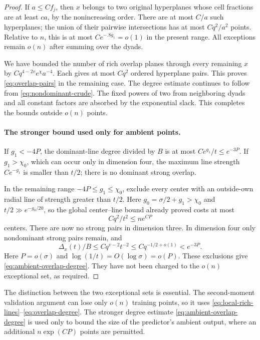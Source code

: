 \begin{proof}
If $a\le Cf_j$, then $x$ belongs to two original hyperplanes whose cell
fractions are at least $ca$, by the nonincreasing order.  There are at
most $C/a$ such hyperplanes; the union of their pairwise intersections
has at most $Cq^2/a^2$ points.  Relative to $n$, this is at most
$Ce^{-.8g_1}=o(1)$ in the present range.  All exceptions remain $o(n)$
after summing over the dyads.

We have bounded the number of rich overlap planes through every
remaining $x$ by $Cq^{4-2v}e^\chi a^{-4}$.  Each gives at most $Cq^2$
ordered hyperplane pairs.  This proves
\eqref{eq:overlap-pairs} in the remaining case.  The degree estimate
continues to follow from \eqref{eq:nondominant-crude}.  The fixed powers
of two from neighboring dyads and all constant factors are absorbed by
the exponential slack.  This completes the bounds outside $o(n)$ points.

\paragraph{The stronger bound used only for ambient points.}
If $g_1<-4P$, the dominant-line degree divided by $B$ is at most
$Ce^{g_1}/t\le e^{-3P}$.  If $g_1>\chi_0$, which can occur only in
dimension four, the maximum line strength $Ce^{-g_1}$ is smaller than
$t/2$; there is no dominant strong overlap.

In the remaining range $-4P\le g_1\le\chi_0$, exclude every center with
an outside-own radial line of strength greater than $t/2$.  Here
$g_0=\sigma/2+g_1>\chi_0$ and
$t/2\gg e^{-g_0/20}$, so the global center--line bound already proved
costs at most
\[
 Cq^2/t^2\le n e^{CP}
\]
centers.  There are now no strong pairs in dimension three.  In dimension
four only nondominant strong pairs remain, and
\[
 \Delta_x(t)/B\le Cq^{v-2}t^{-2}
 \le Cq^{-1/2+o(1)}<e^{-3P}.
\]
Here $P=o(\sigma)$ and $\log(1/t)=O(\log\sigma)=o(P)$.
These exclusions give \eqref{eq:ambient-overlap-degree}.  They have not
been charged to the $o(n)$ exceptional set, as required.
\end{proof}

\begin{remark}\label{rem:geometry-validation}
The distinction between the two exceptional sets is essential.  The
second-moment validation argument can lose only $o(n)$ training points,
so it uses \eqref{eq:local-rich-lines}--\eqref{eq:overlap-degree}.
The stronger degree estimate \eqref{eq:ambient-overlap-degree} is used
only to bound the size of the predictor's ambient output, where an
additional $n\exp(CP)$ points are permitted.
\end{remark}
